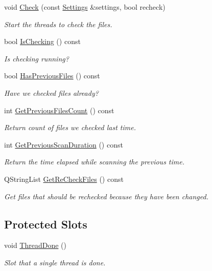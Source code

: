 \begin{DoxyCompactItemize}
void \hyperlink{class_thread_handler_a0ffd4b58e3c649decc8320ae062cbc67}{Check} (const \hyperlink{class_settings}{Settings} \&settings, bool recheck)
\begin{DoxyCompactList}\small\item\em Start the threads to check the files. \end{DoxyCompactList}\item 
bool \hyperlink{class_thread_handler_a301638dcb288e0aebdaa4706407271f3}{Is\-Checking} () const 
\begin{DoxyCompactList}\small\item\em Is checking running? \end{DoxyCompactList}\item 
bool \hyperlink{class_thread_handler_a27a367ae33c7d4c9b224078314bf27d3}{Has\-Previous\-Files} () const 
\begin{DoxyCompactList}\small\item\em Have we checked files already? \end{DoxyCompactList}\item 
int \hyperlink{class_thread_handler_ae1127ae99c36be91f145af805e05c695}{Get\-Previous\-Files\-Count} () const 
\begin{DoxyCompactList}\small\item\em Return count of files we checked last time. \end{DoxyCompactList}\item 
int \hyperlink{class_thread_handler_afd10d2874ef8fe5b4df6b2d9f38fbebd}{Get\-Previous\-Scan\-Duration} () const 
\begin{DoxyCompactList}\small\item\em Return the time elapsed while scanning the previous time. \end{DoxyCompactList}\item 
Q\-String\-List \hyperlink{class_thread_handler_a37936b66bbdfecaf1b9fa3ae995e17cb}{Get\-Re\-Check\-Files} () const 
\begin{DoxyCompactList}\small\item\em Get files that should be rechecked because they have been changed. \end{DoxyCompactList}\end{DoxyCompactItemize}
\subsection*{Protected Slots}
\begin{DoxyCompactItemize}
\item 
void \hyperlink{class_thread_handler_a10113089f9367cbbd6fd17705f15a09e}{Thread\-Done} ()
\begin{DoxyCompactList}\small\item\em Slot that a single thread is done. \end{DoxyCompactList}\end{DoxyCompactItemize}
